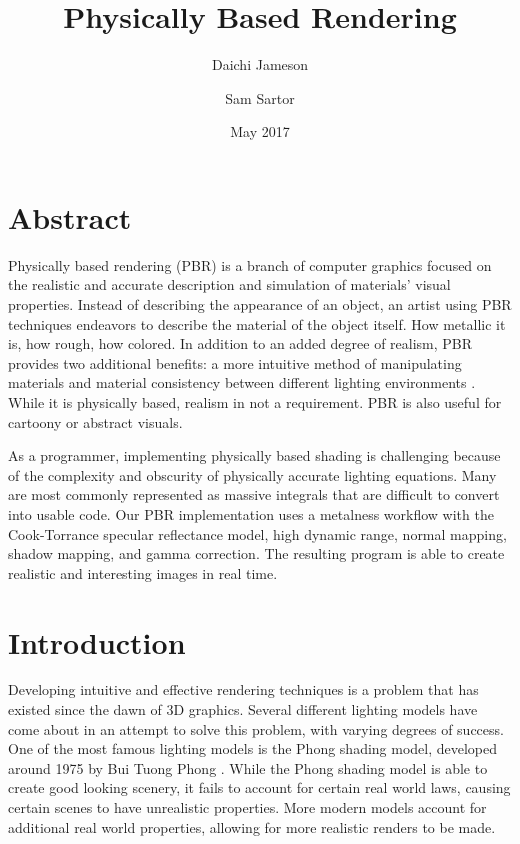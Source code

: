 \documentclass[12pt, letterpaper, twocolumn]{article}
\title{Physically Based Rendering}
\author{Daichi Jameson \and Sam Sartor}
\date{May 2017}
\begin{document}
\begin{titlepage}
\maketitle
\end{titlepage}
 
\section{Abstract}

Physically based rendering (PBR) is a branch of computer graphics focused on
the realistic and accurate description and simulation of materials’ visual
properties. Instead of describing the appearance of an object, an artist using
PBR techniques endeavors to describe the material of the object itself. How
metallic it is, how rough, how colored. In addition to an added degree of
realism, PBR provides two additional benefits: a more intuitive method of
manipulating materials and material consistency between different lighting
environments \cite{lerpGL}. While it is physically based, realism in not a
requirement. PBR is also useful for cartoony or abstract visuals.

As a programmer, implementing physically based shading is challenging because
of the complexity and obscurity of physically accurate lighting equations.
Many are most commonly represented as massive integrals that are difficult to
convert into usable code. Our PBR implementation uses a metalness workflow
with the Cook-Torrance specular reflectance model, high dynamic range, normal
mapping, shadow mapping, and gamma correction. The resulting program is able
to create realistic and interesting images in real time.

\section{Introduction}

Developing intuitive and effective rendering techniques is a problem that has
existed since the dawn of 3D graphics. Several different lighting models have
come about in an attempt to solve this problem, with varying degrees of
success. One of the most famous lighting models is the Phong shading model,
developed around 1975 by Bui Tuong Phong \cite{panini}. While the Phong
shading model is able to create good looking scenery, it fails to account for
certain real world laws, causing certain scenes to have unrealistic
properties. More modern models account for additional real world properties,
allowing for more realistic renders to be made.
 
\end{document}
